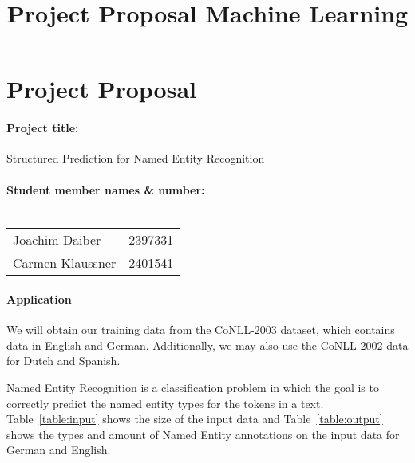 \documentclass[a4paper,10pt]{article}
\title{Project Proposal Machine Learning}
\author{}
\date{}
\begin{document}
\maketitle

% 
% 


\section*{Project Proposal}

\paragraph{Project title:}
Structured Prediction for Named Entity Recognition

\paragraph{Student member names \& number:\\\\}

\begin{tabular}{l l}
Joachim Daiber   & 2397331 \\
Carmen Klaussner & 2401541\\
\end{tabular}



\paragraph{Application}
We will obtain our training data from the CoNLL-2003\cite{TjongKimSang:2003:ICS:1119176.1119195} dataset, which contains
data in English and German. Additionally, we may also use the CoNLL-2002 data for Dutch and Spanish. 

Named Entity Recognition is a classification problem in which the goal is to correctly predict the named entity types for
the tokens in a text. Table~\ref{table:input} shows the size of the input data and Table~\ref{table:output} shows the types and amount of Named Entity annotations on the input data for German and English.
\end{document}
